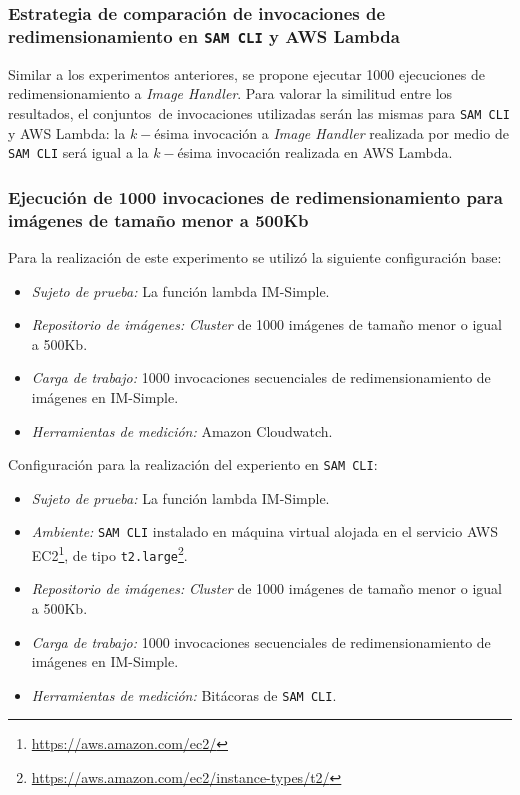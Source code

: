 \subsubsection{Estrategia de comparación de invocaciones de redimensionamiento en \texttt{SAM CLI} y AWS Lambda}

Similar a los experimentos anteriores, se propone ejecutar 1000 ejecuciones de redimensionamiento a \emph{Image Handler}. Para valorar la similitud entre los resultados, el conjuntos\ de invocaciones utilizadas serán las mismas para \texttt{SAM CLI} y AWS Lambda: la $k-$ésima invocación a \emph{Image Handler} realizada por medio de \texttt{SAM CLI} será igual a la $k-$ésima invocación realizada en AWS Lambda.

\subsubsection{Ejecución de 1000 invocaciones de redimensionamiento para imágenes de tamaño menor a 500Kb}

Para la realización de este experimento se utilizó la siguiente configuración base:
\begin{itemize}
    \item \emph{Sujeto de prueba:} La función lambda IM-Simple.
    \item \emph{Repositorio de imágenes:} \emph{Cluster} de 1000 imágenes de tamaño menor o igual a 500Kb.
    \item \emph{Carga de trabajo:} 1000 invocaciones secuenciales de redimensionamiento de imágenes en IM-Simple.
    \item \emph{Herramientas de medición:} Amazon Cloudwatch.
\end{itemize}

Configuración para la realización del experiento en \texttt{SAM CLI}:
\begin{itemize}
    \item \emph{Sujeto de prueba:} La función lambda IM-Simple.
    \item \emph{Ambiente:} \texttt{SAM CLI} instalado en máquina virtual alojada en el servicio AWS EC2\footnote{\url{https://aws.amazon.com/ec2/}}, de tipo \texttt{t2.large}\footnote{\url{https://aws.amazon.com/ec2/instance-types/t2/}}.
    \item \emph{Repositorio de imágenes:} \emph{Cluster} de 1000 imágenes de tamaño menor o igual a 500Kb.
    \item \emph{Carga de trabajo:} 1000 invocaciones secuenciales de redimensionamiento de imágenes en IM-Simple.
    \item \emph{Herramientas de medición:} Bitácoras de \texttt{SAM CLI}.
\end{itemize}


